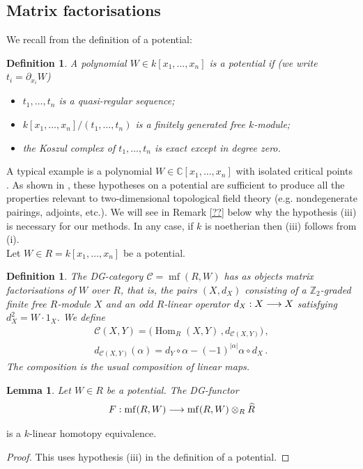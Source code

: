 \documentclass[english,letter paper,12pt,leqno]{article}
\newtheorem{lemma}[theorem]{Lemma}
\theoremstyle{example}
\newtheorem{definition}[theorem]{Definition}
\numberwithin{equation}{section}
\def\Hom{\operatorname{Hom}}
\DeclareMathOperator{\mf}{mf}
\begin{document}
\subsection{Matrix factorisations}

We recall from \cite{lgdual} the definition of a potential:

\begin{definition}\label{defn:potential} A polynomial $W \in k[x_1,\ldots,x_n]$ is a \textsl{potential} if (we write $t_i = \partial_{x_i} W$)
\begin{itemize}
\item[(i)] $t_1,\ldots,t_n$ is a quasi-regular sequence;
\item[(ii)] $k[x_1,\ldots,x_n]/(t_1,\ldots,t_n)$ is a finitely generated free $k$-module;
\item[(iii)] the Koszul complex of $t_1,\ldots,t_n$ is exact except in degree zero.
\end{itemize}
\end{definition}

A typical example is a polynomial $W \in \mathbb{C}[x_1,\ldots,x_n]$ with isolated critical points \cite[Example ??]{lgdual}. As shown in \cite{lgdual}, these hypotheses on a potential are sufficient to produce all the properties relevant to two-dimensional topological field theory (e.g. nondegenerate pairings, adjoints, etc.). We will see in Remark \ref{??} below why the hypothesis (iii) is necessary for our methods. In any case, if $k$ is noetherian then (iii) follows from (i).
\\

Let $W \in R = k[x_1,\ldots,x_n]$ be a potential. 

\begin{definition} The DG-category $\mathscr{C} = \mf(R,W)$ has as objects \emph{matrix factorisations} of $W$ over $R$, that is, the pairs $(X, d_X)$ consisting of a $\mathbb{Z}_2$-graded finite free $R$-module $X$ and an odd $R$-linear operator $d_X: X \longrightarrow X$ satisfying $d_X^2 = W \cdot 1_X$. We define
\begin{gather*}
\mathscr{C}(X,Y) = \big( \Hom_R(X,Y) \,, d_{\mathscr{C}(X,Y)} \big)\,,\\
d_{\mathscr{C}(X,Y)}(\alpha)  = d_Y \circ \alpha - (-1)^{|\alpha|} \alpha \circ d_X\,.
\end{gather*}
The composition is the usual composition of linear maps.
\end{definition}

\begin{lemma} Let $W \in R$ be a potential. The DG-functor
\[
F: \mf(R,W) \lto \mf(R, W) \otimes_R \widehat{R}
\]
\end{lemma}
is a $k$-linear homotopy equivalence.
\begin{proof}
This uses hypothesis (iii) in the definition of a potential.
\end{proof}
\end{document}
